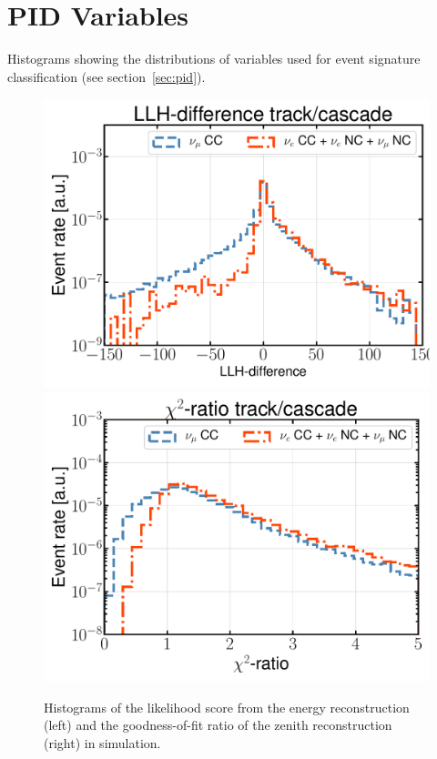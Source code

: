 \section{PID Variables}
\label{sec:apx-pidvars}
Histograms showing the distributions of variables used for event signature classification (see section~\ref{sec:pid}).

\begin{figure}
    \centering
    \includegraphics[width=0.49\linewidth]{figures/icecube/classification/variables/leera.pdf}
    \includegraphics[width=0.49\linewidth]{figures/icecube/classification/variables/santa.pdf}
    \caption{Histograms of the likelihood score from the energy reconstruction (left) and the goodness-of-fit ratio of the zenith reconstruction (right) in simulation.}
    \label{fig:apx-pidvars-santa-leera}
\end{figure}

